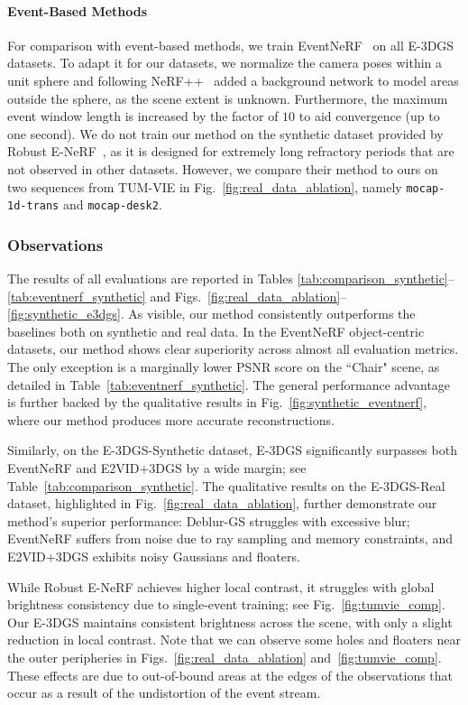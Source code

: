 \paragraph{Event-Based Methods}
For comparison with event-based methods, we train EventNeRF~\cite{eventnerf} on all E-3DGS datasets. To adapt it for our datasets, we normalize the camera poses within a unit sphere and following NeRF++~\cite{nerf++} added a background network to model areas outside the sphere, as the scene extent is unknown. Furthermore, the maximum event window length is increased by the factor of $10$ to aid convergence (up to one second). 
We do not train our method on the synthetic dataset provided by Robust E-NeRF~\cite{robust_enerf}, as it is designed for extremely long refractory periods that are not observed in other datasets. However, we compare their method to ours on two sequences from TUM-VIE in Fig.~\ref{fig:real_data_ablation}, namely \texttt{mocap-1d-trans} and \texttt{mocap-desk2}.


\subsubsection{Observations}

The results of all evaluations are reported in Tables \ref{tab:comparison_synthetic}--\ref{tab:eventnerf_synthetic} and Figs.~\ref{fig:real_data_ablation}--\ref{fig:synthetic_e3dgs}. 
As visible, our method consistently outperforms the baselines both on synthetic and real data. 
In the EventNeRF object-centric datasets, our method shows clear superiority across almost all evaluation metrics. The only exception is a marginally lower PSNR score on the ``Chair" scene, as detailed in Table~\ref{tab:eventnerf_synthetic}. The general performance advantage is further backed by the qualitative results in Fig.~\ref{fig:synthetic_eventnerf}, where our method produces more accurate reconstructions. 



Similarly, on the E-3DGS-Synthetic dataset, E-3DGS significantly surpasses both EventNeRF and E2VID+3DGS by a wide margin; see Table~\ref{tab:comparison_synthetic}. The qualitative results on the E-3DGS-Real dataset, highlighted in Fig.~\ref{fig:real_data_ablation}, further demonstrate our method's superior performance: Deblur-GS struggles with excessive blur; EventNeRF suffers from noise due to ray sampling and memory constraints, and E2VID+3DGS exhibits noisy Gaussians and floaters. 

While Robust E-NeRF achieves higher local contrast, it struggles with global brightness consistency due to single-event training; see Fig.~\ref{fig:tumvie_comp}. Our E-3DGS maintains consistent brightness across the scene, with only a slight reduction in local contrast. 
Note that we can observe some holes and floaters near the outer peripheries in Figs.~\ref{fig:real_data_ablation} and~\ref{fig:tumvie_comp}. These effects are due to out-of-bound areas at the edges of the observations that occur as a result of the undistortion of the event stream. 







